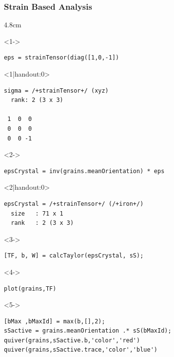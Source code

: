 \documentclass[compress,aspectratio=1610,fleqn]{beamer}
\begin{document}
\begin{frame}[fragile]
  \frametitle{Strain Based Analysis}
  \vspace{-0.5cm}
  \begin{overlayarea}{\textwidth}{4.8cm}
    \begin{onlyenv}<1->
\begin{lstlisting}[style=input]
eps = strainTensor(diag([1,0,-1])
\end{lstlisting}
  \end{onlyenv}
  \begin{onlyenv}<1|handout:0>
    \vspace{-0.35cm}
\begin{lstlisting}[style=output]
sigma = /+strainTensor+/ (xyz)
  rank: 2 (3 x 3)

 1  0  0
 0  0  0
 0  0 -1
\end{lstlisting}
    \end{onlyenv}
    \vspace{-0.35cm}
    \begin{onlyenv}<2->
\begin{lstlisting}[style=input]
epsCrystal = inv(grains.meanOrientation) * eps
\end{lstlisting}
    \end{onlyenv}
    \begin{onlyenv}<2|handout:0>
      \vspace{-0.35cm}
\begin{lstlisting}[style=output]
epsCrystal = /+strainTensor+/ (/+iron+/)
  size   : 71 x 1
  rank   : 2 (3 x 3)
\end{lstlisting}
    \end{onlyenv}
    \begin{onlyenv}<3->
      \vspace{-0.35cm}
      \begin{lstlisting}[style=input]
[TF, b, W] = calcTaylor(epsCrystal, sS);
      \end{lstlisting}
    \end{onlyenv}
    \begin{onlyenv}<4->
      \vspace{-0.35cm}
      \begin{lstlisting}[style=input]
plot(grains,TF)
\end{lstlisting}
    \end{onlyenv}
    \begin{onlyenv}<5->
      \vspace{-0.35cm}
      \begin{lstlisting}[style=input]
[bMax ,bMaxId] = max(b,[],2);
sSactive = grains.meanOrientation .* sS(bMaxId);
quiver(grains,sSactive.b,'color','red')
quiver(grains,sSactive.trace,'color','blue')
\end{lstlisting}
\end{onlyenv}
\end{overlayarea}


\end{frame}
\end{document}
